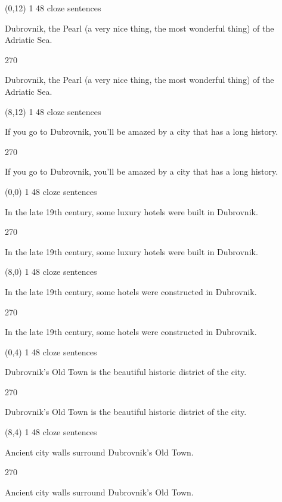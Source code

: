 \documentclass[a4paper]{article}
\newenvironment{itemize*}%
{\begin{itemize}%
 \setlength{\itemsep}{0.5cm}%
 \setlength{\parsep}{0pt}%
 \setlength{\parskip}{0pt}}%
{\end{itemize}}
\newcommand{\mycard}[3]{%
	\small #1 #2
	\par
	\parbox[t][6.8cm][c]{9.5cm}{%
	\par
	\myleft{#3}
	\par
	\myright{#3}
	}
}
\newcommand{\myleft}[1]{%
	\begin{sideways}
	\hspace*{-0.9cm}
		\parbox[t][2.7cm][t]{6.5cm}{%
		\large #1
		}
	\end{sideways}
}
\newcommand{\myright}[1]{%
	\hspace*{6.5cm}
	\begin{turn}{270}
	\hspace*{-7.1cm}
		\parbox[t][2.7cm][t]{6.5cm}{%
		\large #1
		}
	\end{turn}
}
\begin{document}
\begin{textblock}{8}(0,12)
\mycard{1}{48 cloze sentences}{
\begin{itemize*}
\item Dubrovnik, the Pearl (a very nice thing, the most wonderful thing) of the Adriatic Sea.
\end{itemize*}
}
\end{textblock}

\begin{textblock}{8}(8,12)
\mycard{1}{48 cloze sentences}{
\begin{itemize*}
\item If you go to Dubrovnik, you'll be amazed by a city that has a long history.
\end{itemize*}
}
\end{textblock}

\null
\newpage

\begin{textblock}{8}(0,0)
\mycard{1}{48 cloze sentences}{
\begin{itemize*}
\item In the late 19th century, some luxury hotels were built in Dubrovnik.
\end{itemize*}
}
\end{textblock}

\begin{textblock}{8}(8,0)
\mycard{1}{48 cloze sentences}{
\begin{itemize*}
\item In the late 19th century, some hotels were constructed in Dubrovnik.
\end{itemize*}
}
\end{textblock}

\begin{textblock}{8}(0,4)
\mycard{1}{48 cloze sentences}{
\begin{itemize*}
\item Dubrovnik's Old Town is the beautiful historic district of the city.
\end{itemize*}
}
\end{textblock}

\begin{textblock}{8}(8,4)
\mycard{1}{48 cloze sentences}{
\begin{itemize*}
\item Ancient city walls surround Dubrovnik's Old Town.
\end{itemize*}
}
\end{textblock}
\end{document}
